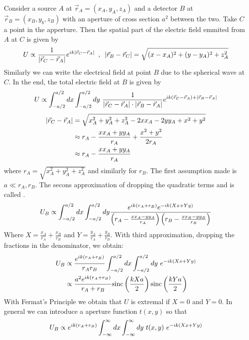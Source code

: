 Consider a source $A$ at $\vec{r}_A = (x_A , y_A , z_A)$ and a detector $B$ at
$\vec{r}_B = (x_B , y_b , z_B)$ with an aperture of cross section $a^2$ between
the two. Take $C$ a point in the apperture. Then the spatial part of the electric
field emmited from $A$ at $C$ is given by
\begin{align*}
    U \propto \frac{1}{\left\vert \vec{r}_C - \vec{r}_A \right\vert} e^{i k \left\vert \vec{r}_C - \vec{r}_A \right\vert}
    \hspace{5pt} , \hspace{5pt}
    \left\vert \vec{r}_B - \vec{r}_C \right\vert = \sqrt{(x-x_A)^2 + (y-y_A)^2 + z_A^2}
\end{align*}
Similarly we can write the electrical field at point $B$ due to the spherical
wave at $C$. In the end, the total electric field at $B$ is given by
\begin{align*}
    U \propto \int_{-a/2}^{a/2} dx \int_{-a/2}^{a/2} dy \
    \frac{1}{\left\vert \vec{r}_C - \vec{r}_A \right\vert \cdot \left\vert \vec{r}_B - \vec{r}_A \right\vert}
    e^{i k \left( \vec{r}_C - \vec{r}_A \right) + \left\vert \vec{r}_B - \vec{r}_A \right\vert}
\end{align*}
\begin{align*}
    \left\vert \vec{r}_C - \vec{r}_A \right\vert &= \sqrt{x_A^2 + y_A^2 + z_A^2 - 2 x x_A - 2 y y_A + x^2 + y^2}
    \\
    &\approx r_A - \frac{x x_A + y y_A}{r_A} + \frac{x^2 + y^2}{2 r_A}
    \\
    &\approx r_A - \frac{x x_A + y y_A}{r_A}
\end{align*}
where $r_A = \sqrt{x_A^2 + y_A^2 + z_A^2}$ and similarly for $r_B$. The first
assumption made is $a \ll r_A , r_B$. The secons approximation of dropping the
quadratic terms and is called \fat{Fraunhofer approximation}.
\begin{align*}
    U_B \propto \int_{-a/2}^{a/2} dx \int_{-a/2}^{a/2} dy
    \frac{e^{i k (r_A + r_B)} e^{-i k (X x + Y y)}}{\left( r_A - \frac{x x_A - y y_A}{r_A} \right) \left( r_B - \frac{x x_B - y y_B}{r_B} \right)}
\end{align*}
Where $X = \frac{x_A}{r_A} + \frac{x_B}{r_B}$ and $Y = \frac{y_A}{r_A} + \frac{y_B}{r_B}$.
With third approximation, dropping the fractions in the denominator, we obtain:
\begin{align*}
    U_B &\propto \frac{e^{i k (r_A + r_B)}}{r_A r_B} \int_{-a/2}^{a/2} dx \int_{-a/2}^{a/2} dy \ e^{-i k (X x + Y y)} 
    \\
    &\propto \frac{a^2 e^{i k (r_A + r_B)}}{r_A + r_B} \text{sinc} \left( \frac{k X a}{2} \right) \text{sinc} \left( \frac{k Y a}{2} \right)
\end{align*}
With Fermat's Principle we obtain that $U$ is extremal if $X = 0$ and $Y=0$.
In general we can introduce a aperture function $t(x,y)$ so that
\begin{align*}
    U_B \propto e^{i k (r_A + r_B)} \intii dx \intii dy \ t(x,y) \ e^{-ik(X x + Y y)}
\end{align*}

